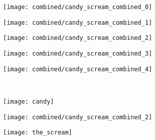 \begin{figure}
	\begin{subfigure}{0.18\textwidth}
		\texttt{[image: combined/candy\_scream\_combined\_0]}
	\end{subfigure}
	\begin{subfigure}{0.18\textwidth}
		\texttt{[image: combined/candy\_scream\_combined\_1]}
	\end{subfigure}
	\begin{subfigure}{0.18\textwidth}
		\texttt{[image: combined/candy\_scream\_combined\_2]}
	\end{subfigure}
	\begin{subfigure}{0.18\textwidth}
		\texttt{[image: combined/candy\_scream\_combined\_3]}
	\end{subfigure}
	\begin{subfigure}{0.18\textwidth}
		\texttt{[image: combined/candy\_scream\_combined\_4]}
	\end{subfigure}\\
	\vspace{0.1cm}
	\begin{subfigure}[t]{0.1\textwidth}
		\vskip 0pt
		\texttt{[image: candy]}
	\end{subfigure}
	\begin{subfigure}[t]{0.4\textwidth}
		\vskip 0pt
		\texttt{[image: combined/candy\_scream\_combined\_2]}
	\end{subfigure}
	\begin{subfigure}[t]{0.1\textwidth}
		\vskip 0pt
		\texttt{[image: the\_scream]}
	\end{subfigure}\\


\end{figure}

